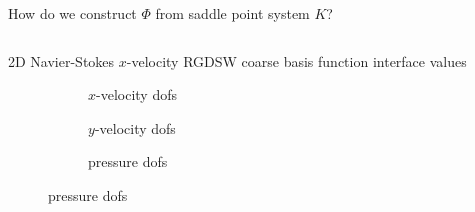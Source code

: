 \begin{frame}{How do we construct $\varPhi$ from saddle point system $K$?}
\begin{columns}
\begin{column}{0.52\textwidth}
{\begin{block}{\normalsize 2D Navier-Stokes $x$-velocity RGDSW coarse basis function interface values}
\begin{figure}
\begin{subfigure}{0.29\textwidth}
							\centering
							
							\vspace*{-5mm}
							\caption{$x$-velocity dofs}
						\end{subfigure}
						\vfill
						\hspace*{-12mm}
						\begin{subfigure}{0.29\textwidth}
							\centering
							
							\vspace*{-5mm}
							\caption{$y$-velocity dofs}
						\end{subfigure}
                        \hspace{12mm}
						\begin{subfigure}{0.29\textwidth}
							\centering
							
							\vspace*{-5mm}
							\caption{pressure dofs}
						\end{subfigure}
					\end{figure}
                    \vspace{1.5mm}
				\end{block}
			}
\end{column}
\end{columns}
\end{frame}
